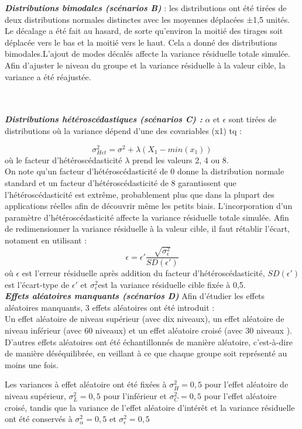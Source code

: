 \documentclass{article}
\begin{document}
\textbf{\textit{Distributions bimodales (scénarios B) }}: les distributions ont été tirées de deux distributions normales distinctes avec les moyennes déplacées ±1,5 unités. Le décalage a été fait au hasard, de sorte qu'environ la moitié des tirages soit déplacée vers le bas et la moitié vers le haut. Cela a donné des distributions bimodales.L'ajout de modes décalés affecte la variance résiduelle totale simulée. Afin d'ajuster le niveau du groupe et la variance résiduelle à la valeur cible, la variance a été  réajustée. \\ \\\

\textbf{\textit{Distributions hétéroscédastiques (scénarios C) :}}  $\alpha$ et $\epsilon$  sont tirées de distributions où la variance dépend d'une des covariables (x1) tq : 

$$\sigma^2_{Het}=\sigma^2 + \lambda(X_1-min(x_1)) $$
où le facteur d'hétéroscédasticité $\lambda$  prend les valeurs 2, 4 ou 8. \\
On note qu’un facteur d'hétéroscédasticité de 0 donne la distribution normale standard et un facteur d'hétéroscédasticité de 8 garantissent que l'hétéroscédasticité est extrême, probablement plus que dans la plupart des applications réelles afin de découvrir même les petits biais. L'incorporation d'un paramètre d'hétéroscédasticité affecte la variance résiduelle totale simulée. Afin de redimensionner la variance résiduelle à la valeur cible, il faut rétablir l'écart, notament en utilisant : $$ \epsilon=\epsilon'\frac{\sqrt{\sigma^2_\epsilon	}}{SD(\epsilon')}$$
où $\epsilon$ est l'erreur résiduelle après addition du facteur d'hétéroscédasticité, $SD(\epsilon′)$ est l'écart-type de $\epsilon′$ et $\sigma^2_\epsilon$est la variance résiduelle cible fixée à 0,5. \\ 

 \textbf{\textit{Effets aléatoires manquants (scénarios D)}} 
Afin d'étudier les effets aléatoires manquants,  3 effets aléatoires ont été introduit : \\
Un effet aléatoire de niveau supérieur (avec dix niveaux), un effet aléatoire de niveau inférieur (avec 60 niveaux) et un effet aléatoire croisé (avec 30 niveaux  ). D'autres effets aléatoires ont été échantillonnés de manière aléatoire, c'est-à-dire de manière déséquilibrée, en veillant à ce que chaque groupe soit représenté au moins une fois.

Les variances à effet aléatoire ont été fixées à $\sigma^2_H = 0,5$ pour l'effet aléatoire de niveau supérieur, $\sigma^2_L = 0,5$ pour l’inférieur et $\sigma^2_C = 0,5$ pour l'effet aléatoire croisé, tandis que la variance de l'effet aléatoire d'intérêt et la variance résiduelle ont été conservés à $\sigma^2_\alpha = 0,5$ et $\sigma^2_\epsilon = 0,5$  \\ 
\end{document}
